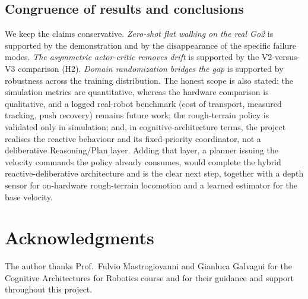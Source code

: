 \documentclass[conference]{IEEEtran}
\begin{document}
\subsection{Congruence of results and conclusions}
We keep the claims conservative. \emph{Zero-shot flat walking on the real Go2} is supported by the
demonstration and by the disappearance of the specific failure modes. \emph{The asymmetric
actor-critic removes drift} is supported by the V2-versus-V3 comparison (H2). \emph{Domain
randomization bridges the gap} is supported by robustness across the training distribution. The
honest scope is also stated: the simulation metrics are quantitative, whereas the hardware
comparison is qualitative, and a logged real-robot benchmark (cost of transport, measured
tracking, push recovery) remains future work; the rough-terrain policy is validated only in
simulation; and, in cognitive-architecture terms, the project realises the reactive behaviour and
its fixed-priority coordinator, not a deliberative Reasoning/Plan layer. Adding that layer, a
planner issuing the velocity commands the policy already consumes, would complete the hybrid
reactive-deliberative architecture and is the clear next step, together with a depth sensor for
on-hardware rough-terrain locomotion and a learned estimator for the base velocity.

\section*{Acknowledgments}
The author thanks Prof.\ Fulvio Mastrogiovanni and Gianluca Galvagni for the Cognitive
Architectures for Robotics course and for their guidance and support throughout this project.
\end{document}
